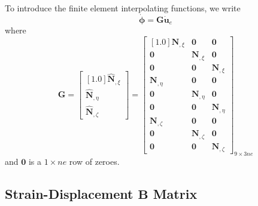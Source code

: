 \documentclass[11pt]{report}
\numberwithin{equation}{section}
\newcommand{\bmf } {\boldsymbol }  %
\newcommand{\nid}{\noindent}
\begin{document}
To introduce the finite element
interpolating functions, we write
%
\begin{equation}\label{ECDj}
\dot{\bmf{\phi}} = \mathbf{G} \dot{ \bmf{u}}_e
\end{equation}
%
\nid where
%
\begin{equation}\label{E:CDk}
\mathbf{G}= \begin{bmatrix}[1.0]
\hat{ \bmf{N}}_{,\xi}  \\\hat{ \bmf{N}}_{,\eta}  \\\hat{ \bmf{N}}_{,\zeta}   
   \end{bmatrix}=
 \begin{bmatrix}[1.0]
 \bmf{N}_{,\xi} & \bmf{0} & \bmf{0}  \\  \bmf{0} & \bmf{N}_{,\xi} &  \bmf{0}  \\ \bmf{0} & \bmf{0}  & \bmf{N}_{,\xi} \\ 
  \bmf{N}_{,\eta} & \bmf{0} & \bmf{0}  \\  \bmf{0} & \bmf{N}_{,\eta} &  \bmf{0}  \\ \bmf{0} & \bmf{0}  & \bmf{N}_{,\eta} \\ 
 \bmf{N}_{,\zeta} & \bmf{0} & \bmf{0}  \\  \bmf{0} & \bmf{N}_{,\zeta} &  \bmf{0}  \\ \bmf{0} & \bmf{0}  & \bmf{N}_{,\zeta}  
   \end{bmatrix}_{9\times3ne}
  \end{equation}
%
\nid and $\bmf{0}$ is a $1 \times ne$ row of zeroes.
\subsection{Strain-Displacement $\mathbf{B}$ Matrix}
\end{document}
